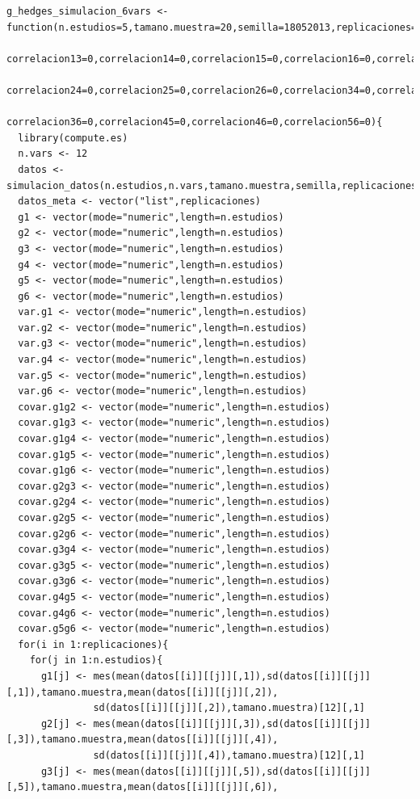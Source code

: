 \documentclass[a4paper,openright,12pt]{report}
\begin{document}
{\begin{verbatim}
g_hedges_simulacion_6vars <- function(n.estudios=5,tamano.muestra=20,semilla=18052013,replicaciones=5,correlacion12=0,
                                      correlacion13=0,correlacion14=0,correlacion15=0,correlacion16=0,correlacion23=0,
                                      correlacion24=0,correlacion25=0,correlacion26=0,correlacion34=0,correlacion35=0,
                                      correlacion36=0,correlacion45=0,correlacion46=0,correlacion56=0){
  library(compute.es)
  n.vars <- 12
  datos <- simulacion_datos(n.estudios,n.vars,tamano.muestra,semilla,replicaciones)
  datos_meta <- vector("list",replicaciones)
  g1 <- vector(mode="numeric",length=n.estudios)
  g2 <- vector(mode="numeric",length=n.estudios)
  g3 <- vector(mode="numeric",length=n.estudios)
  g4 <- vector(mode="numeric",length=n.estudios)
  g5 <- vector(mode="numeric",length=n.estudios)
  g6 <- vector(mode="numeric",length=n.estudios)
  var.g1 <- vector(mode="numeric",length=n.estudios)
  var.g2 <- vector(mode="numeric",length=n.estudios)
  var.g3 <- vector(mode="numeric",length=n.estudios)
  var.g4 <- vector(mode="numeric",length=n.estudios)
  var.g5 <- vector(mode="numeric",length=n.estudios)
  var.g6 <- vector(mode="numeric",length=n.estudios)
  covar.g1g2 <- vector(mode="numeric",length=n.estudios) 
  covar.g1g3 <- vector(mode="numeric",length=n.estudios)
  covar.g1g4 <- vector(mode="numeric",length=n.estudios) 
  covar.g1g5 <- vector(mode="numeric",length=n.estudios) 
  covar.g1g6 <- vector(mode="numeric",length=n.estudios) 
  covar.g2g3 <- vector(mode="numeric",length=n.estudios)
  covar.g2g4 <- vector(mode="numeric",length=n.estudios) 
  covar.g2g5 <- vector(mode="numeric",length=n.estudios) 
  covar.g2g6 <- vector(mode="numeric",length=n.estudios) 
  covar.g3g4 <- vector(mode="numeric",length=n.estudios) 
  covar.g3g5 <- vector(mode="numeric",length=n.estudios) 
  covar.g3g6 <- vector(mode="numeric",length=n.estudios) 
  covar.g4g5 <- vector(mode="numeric",length=n.estudios) 
  covar.g4g6 <- vector(mode="numeric",length=n.estudios) 
  covar.g5g6 <- vector(mode="numeric",length=n.estudios) 
  for(i in 1:replicaciones){
    for(j in 1:n.estudios){
      g1[j] <- mes(mean(datos[[i]][[j]][,1]),sd(datos[[i]][[j]][,1]),tamano.muestra,mean(datos[[i]][[j]][,2]),
               sd(datos[[i]][[j]][,2]),tamano.muestra)[12][,1]
      g2[j] <- mes(mean(datos[[i]][[j]][,3]),sd(datos[[i]][[j]][,3]),tamano.muestra,mean(datos[[i]][[j]][,4]),
               sd(datos[[i]][[j]][,4]),tamano.muestra)[12][,1]
      g3[j] <- mes(mean(datos[[i]][[j]][,5]),sd(datos[[i]][[j]][,5]),tamano.muestra,mean(datos[[i]][[j]][,6]),

\end{verbatim}}
\end{document}

